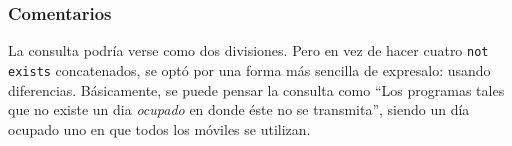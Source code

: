 \subsubsection*{Comentarios}
La consulta podría verse como dos divisiones. Pero en vez de hacer cuatro \lstinline|not exists| concatenados, se optó por una forma más sencilla de expresalo: usando diferencias. Básicamente, se puede pensar la consulta como ``Los programas tales que no existe un dia \textit{ocupado} en donde éste no se transmita'', siendo un día ocupado uno en que todos los móviles se utilizan.
